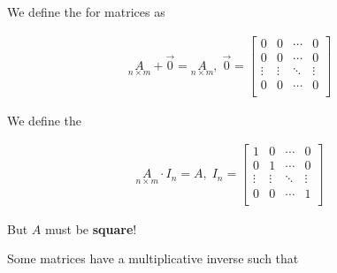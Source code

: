 \documentclass[../../Main.tex]{subfiles}
\begin{document}
\begin{definition}
    We define the  for matrices as

    \begin{align*}
        \underset{\text{$n \times m$}}{A} + \vec{0} = \underset{\text{$n \times m$}}{A}, 
        \;
        \vec{0} =
        \begin{bmatrix}
            0 & 0 & \cdots & 0 \\
            0 & 0 & \cdots & 0 \\
            \vdots & \vdots & \ddots & \vdots \\
            0 & 0 & \cdots & 0 \\
        \end{bmatrix}
    \end{align*}

\end{definition}

\begin{definition}
    We define the 

    \begin{align*}
        \underset{\text{$n \times m$}}{A} \cdot I_n = A,
        \;
        I_n =
        \begin{bmatrix}
            1 & 0 & \cdots & 0 \\
            0 & 1 & \cdots & 0 \\
            \vdots & \vdots & \ddots & \vdots \\
            0 & 0 & \cdots & 1 \\
        \end{bmatrix}
    \end{align*}

    But $A$ must be \textbf{square}!
\end{definition}

Some matrices have a multiplicative inverse such that
\end{document}

